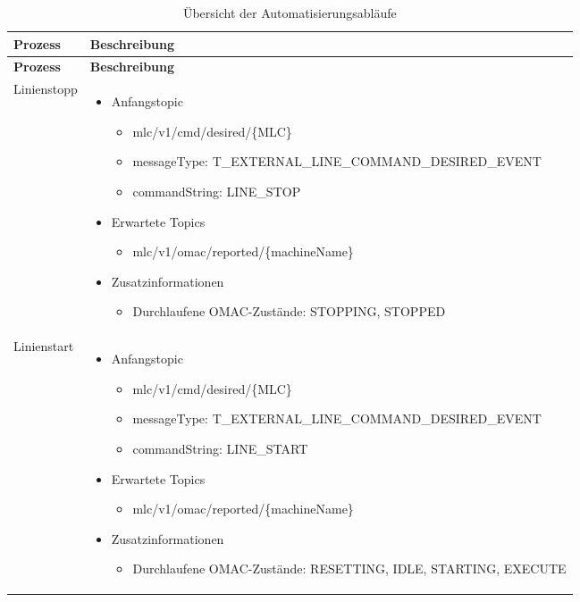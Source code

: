 \begin{longtable}{p{2.5cm} p{12cm}}
    \caption{Übersicht der Automatisierungsabläufe} 
    \label{tab:automatisierungsabläufe} \\ 
    \toprule \textbf{Prozess} & \textbf{Beschreibung} \\ 
    \midrule \endfirsthead \toprule \textbf{Prozess} & \textbf{Beschreibung} \\ 
    \midrule \endhead Linienstopp & \begin{itemize} \item Anfangstopic \begin{itemize} \item mlc/v1/cmd/desired/\{MLC\} \item messageType: T\_EXTERNAL\_LINE\_COMMAND\_\-DESIRED\_EVENT \item commandString: LINE\_STOP \end{itemize} \item Erwartete Topics \begin{itemize} \item mlc/v1/omac/reported/\{machineName\} \end{itemize} \item Zusatzinformationen \begin{itemize} \item Durchlaufene OMAC-Zustände: STOPPING, STOPPED \end{itemize} \end{itemize} \\ 
    \midrule Linienstart & \begin{itemize} \item Anfangstopic \begin{itemize} \item mlc/v1/cmd/desired/\{MLC\} \item messageType: T\_EXTERNAL\_LINE\_COMMAND\_\-DESIRED\_EVENT \item commandString: LINE\_START \end{itemize} \item Erwartete Topics \begin{itemize} \item mlc/v1/omac/reported/\{machineName\} \end{itemize} \item Zusatzinformationen \begin{itemize} \item Durchlaufene OMAC-Zustände: RESETTING, IDLE, STARTING, EXECUTE \end{itemize} \end{itemize} \\ 

\end{longtable}

